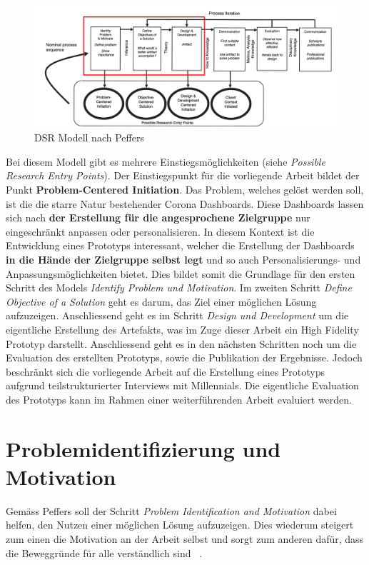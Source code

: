 \documentclass[12pt, oneside]{article}
\begin{document}
\begin{figure}[ht]
	\includegraphics[width=12cm]{images/peffers_dsr_model.png}
	\centering
	\caption{DSR Modell nach Peffers ~\citep{K.Peffers.2007}}
\end{figure}

Bei diesem Modell gibt es mehrere Einstiegsmöglichkeiten (siehe \textit{Possible Research Entry Points}). Der Einstiegspunkt für die vorliegende Arbeit bildet der Punkt \textbf{Problem-Centered Initiation}. Das Problem, welches gelöst werden soll, ist die die starre Natur bestehender Corona Dashboards. Diese Dashboards lassen sich nach \textbf{der Erstellung für die angesprochene Zielgruppe} nur eingeschränkt anpassen oder personalisieren. In diesem Kontext ist die Entwicklung eines Prototyps interessant, welcher die Erstellung der Dashboards \textbf{in die Hände der Zielgruppe selbst legt} und so auch Personalisierungs- und Anpassungsmöglichkeiten bietet. Dies bildet somit die Grundlage für den ersten Schritt des Models \textit{Identify Problem und Motivation}. Im zweiten Schritt \textit{Define Objective of a Solution} geht es darum, das Ziel einer möglichen Lösung aufzuzeigen. Anschliessend geht es im Schritt \textit{Design und Development} um die eigentliche Erstellung des Artefakts, was im Zuge dieser Arbeit ein High Fidelity Prototyp darstellt. Anschliessend geht es in den nächsten Schritten noch um die Evaluation des erstellten Prototyps, sowie die Publikation der Ergebnisse. Jedoch beschränkt sich die vorliegende Arbeit auf die Erstellung eines Prototyps aufgrund teilstrukturierter Interviews mit Millennials. Die eigentliche Evaluation des Prototyps kann im Rahmen einer weiterführenden Arbeit evaluiert werden.


\clearpage
\section{Problemidentifizierung und Motivation}
Gemäss Peffers soll der Schritt \textit{Problem Identification and Motivation} dabei helfen, den Nutzen einer möglichen Lösung aufzuzeigen. Dies wiederum steigert zum einen die Motivation an der Arbeit selbst und sorgt zum anderen dafür, dass die Beweggründe für alle verständlich sind ~\citep[S. 52 + 55]{K.Peffers.2007}. 
\end{document}

